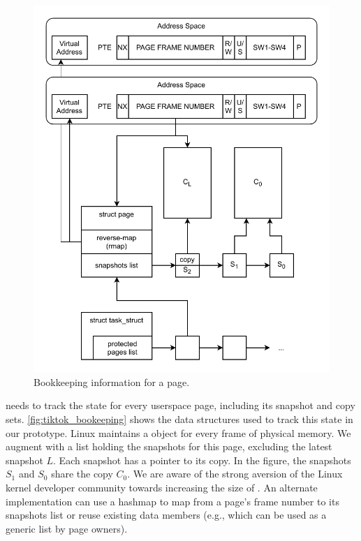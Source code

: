 \documentclass[letterpaper,twocolumn,10pt]{article}
\begin{document}
\begin{figure}[]
  \includegraphics[width=\linewidth]{img/book-keeping.pdf}
  \caption{Bookkeeping information for a page.}
  \label{fig:tiktok_bookeeping}
\end{figure}

\tiktok needs to track the state for every userspace page, including
its snapshot and copy sets.
\autoref{fig:tiktok_bookeeping} shows the data structures used to
track this state in our prototype.
Linux maintains a  object for every frame of 
physical memory. 
We augment   with a list holding the snapshots
for this page, excluding the latest snapshot $L$.
Each snapshot has a pointer to its copy. 
In the figure, the snapshots $S_1$ and $S_0$ share the copy $C_0$.
We are aware of the strong aversion of the 
Linux kernel developer community towards increasing the size of 
. 
An alternate implementation can use a hashmap to
map from a page's frame number to its snapshots list or
reuse existing data members (e.g.,  which 
can be used as a generic list by page owners).
\end{document}
